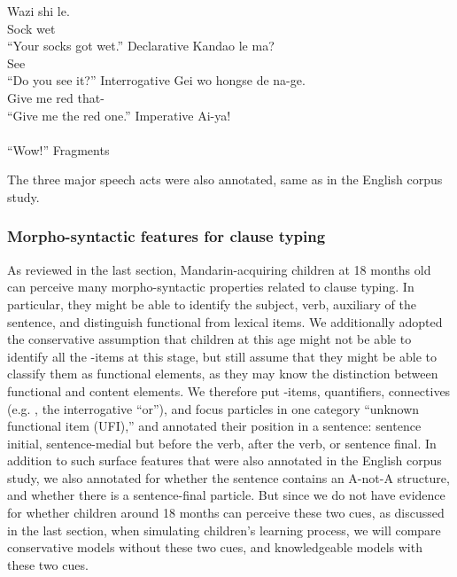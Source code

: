 \bxl \label{ex:mancl:annt:cl:dec}
\gll Wazi shi le.\\
Sock wet \Sfp{}\\
``Your socks got wet.'' \hfill Declarative
\ex \label{ex:mancl:annt:cl:int}
\gll Kandao le ma?\\
See \Asp{} \Sfp{}\\
\trans``Do you see it?''  \hfill Interrogative
\ex \label{ex:mancl:annt:cl:imp}
\gll Gei wo hongse de na-ge.\\
Give me red  that-\Cl{}\\
\trans``Give me the red one.'' \hfill Imperative
\ex \label{ex:mancl:annt:cl:frag}
\gll Ai-ya!\\
 \\
\trans ``Wow!'' \hfill Fragments
\exl
\eex

The three major speech acts were also annotated, same as in the English corpus study.

\subsubsection{Morpho-syntactic features for clause typing}

As reviewed in the last section, Mandarin-acquiring children at 18 months old can perceive many morpho-syntactic properties related to clause typing. In particular, they might be able to identify the subject, verb, auxiliary of the sentence, and distinguish functional from lexical items. We additionally adopted the conservative assumption that children at this age might not be able to identify all the \twh-items at this stage, but still assume that they might be able to classify them as functional elements, as they may know the distinction between functional and content elements. We therefore put \twh-items, quantifiers, connectives (e.g. , the interrogative ``or''), and focus particles in one category ``unknown functional item (UFI),'' and annotated their position in a sentence: sentence initial, sentence-medial but before the verb, after the verb, or sentence final. In addition to such surface features that were also annotated in the English corpus study, we also annotated for whether the sentence contains an A-not-A structure, and whether there is a sentence-final  particle. But since we do not have evidence for whether children around 18 months can perceive these two cues, as discussed in the last section, when simulating children's learning process, we will compare conservative models without these two cues, and knowledgeable models with these two cues.



